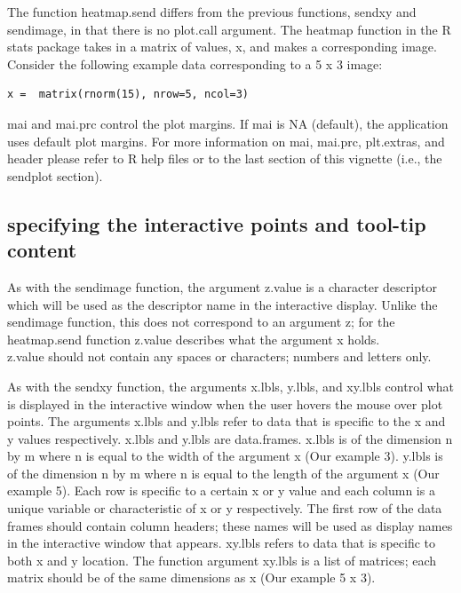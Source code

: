\documentclass[]{article}
\begin{document}
The function heatmap.send differs from the previous functions, sendxy and sendimage, in that there is no plot.call argument. The heatmap function in the R stats package takes in a matrix of values, x,  and makes a corresponding image. Consider the following example data corresponding to a 5 x 3 image: 

\begin{verbatim}
x =  matrix(rnorm(15), nrow=5, ncol=3)
\end{verbatim}


\indent mai and mai.prc control the plot margins. If mai is NA (default), the application uses default plot margins. For more information on mai, mai.prc, plt.extras, and header please refer to R help files or to the last section of this vignette (i.e., the sendplot section). \newline


\subsection{specifying the interactive points and tool-tip content}

As with the sendimage function, the argument z.value is a character descriptor which will be used as the descriptor name in the interactive display. Unlike the sendimage function, this does not correspond to an argument z; for the heatmap.send function z.value describes what the argument x holds. \\

 z.value should not contain any spaces or characters; numbers and letters only.

\indent As with the sendxy function, the arguments x.lbls, y.lbls, and xy.lbls control what is displayed in the interactive window when the user hovers the mouse over plot points. The arguments x.lbls and y.lbls refer to data that is specific to the x and y values respectively. x.lbls and y.lbls are data.frames. x.lbls is of the dimension n by m where n is equal to the width of the argument x (Our example 3). y.lbls is of the dimension n by m where n is equal to the length of the argument x (Our example 5). Each row is specific to a certain x or y value and each column is a unique variable or characteristic of x or y respectively.  The first row of the data frames should contain column headers; these names will be used as display names in the interactive window that appears. xy.lbls refers to data that is specific to both x and y location. The function argument xy.lbls is a list of matrices; each matrix should be of the same dimensions as x (Our example 5 x 3).
\end{document}
